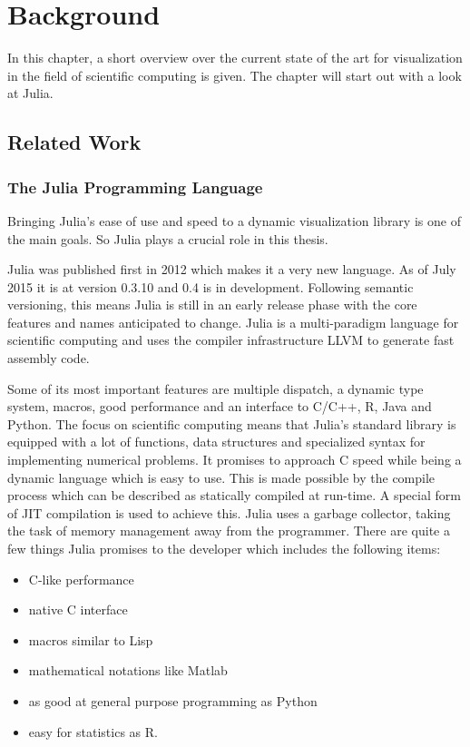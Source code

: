 \section{Background}

In this chapter, a short overview over the current state of the art for visualization in the field of scientific computing is given. The chapter will start out with a look at Julia.

\subsection{Related Work}

\subsubsection{The Julia Programming Language}

Bringing Julia's ease of use and speed to a dynamic visualization library is one of the main goals.
So Julia plays a crucial role in this thesis. 

Julia was published first in 2012 which makes it a very new language. 
As of July 2015 it is at version 0.3.10 and 0.4 is in development.
Following semantic versioning, this means Julia is still in an early release phase with the core features and names anticipated to change\cite{semver}.
Julia is a multi-paradigm language for scientific computing and uses the compiler infrastructure \ac{LLVM} to generate fast assembly code.

Some of its most important features are multiple dispatch, a dynamic type system, macros, good performance and an interface to C/C++, R, Java and Python.
The focus on scientific computing means that Julia's standard library is equipped with a lot of functions, data structures and specialized syntax for implementing numerical problems.
It promises to approach C speed while being a dynamic language which is easy to use.
This is made possible by the compile process which can be described as statically compiled at run-time. A special form of \ac{JIT} compilation is used to achieve this.
Julia uses a garbage collector, taking the task of memory management away from the programmer.
There are quite a few things Julia promises to the developer which includes the following items\cite{WhyJulia}:

\begin{itemize}
    \item C-like performance
    \item native C interface
    \item macros similar to Lisp
    \item mathematical notations like Matlab
    \item as good at general purpose programming as Python
    \item easy for statistics as R.
\end{itemize}

